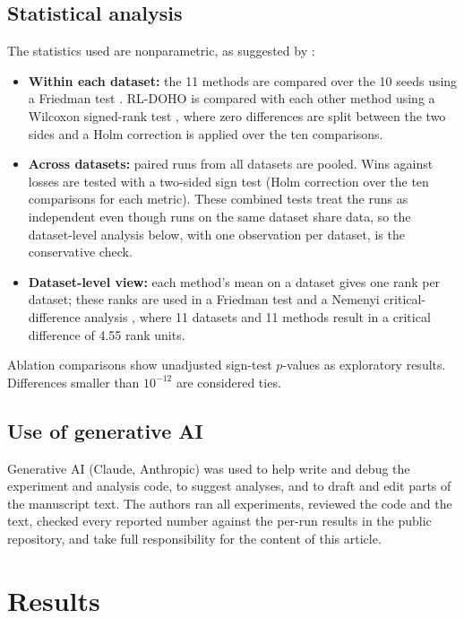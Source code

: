 \documentclass[pdflatex,sn-basic]{sn-jnl}
\begin{document}
\subsection{Statistical analysis}
The statistics used are nonparametric, as suggested by \citet{demsar2006}:
\begin{itemize}
\item \textbf{Within each dataset:} the 11 methods are compared over the 10 seeds using a Friedman test \citep{friedman1937}. RL-DOHO is compared with each other method using a Wilcoxon signed-rank test \citep{wilcoxon1945}, where zero differences are split between the two sides and a Holm correction \citep{holm1979} is applied over the ten comparisons.
\item \textbf{Across datasets:} paired runs from all datasets are pooled. Wins against losses are tested with a two-sided sign test (Holm correction over the ten comparisons for each metric). These combined tests treat the runs as independent even though runs on the same dataset share data, so the dataset-level analysis below, with one observation per dataset, is the conservative check.
\item \textbf{Dataset-level view:} each method's mean on a dataset gives one rank per dataset; these ranks are used in a Friedman test and a Nemenyi critical-difference analysis \citep{nemenyi1963}, where 11 datasets and 11 methods result in a critical difference of 4.55 rank units.
\end{itemize}
Ablation comparisons show unadjusted sign-test $p$-values as exploratory results. Differences smaller than $10^{-12}$ are considered ties.


\subsection{Use of generative AI}
Generative AI (Claude, Anthropic) was used to help write and debug the experiment and analysis code, to suggest analyses, and to draft and edit parts of the manuscript text. The authors ran all experiments, reviewed the code and the text, checked every reported number against the per-run results in the public repository, and take full responsibility for the content of this article.

\section{Results}\label{sec:results}
\end{document}
